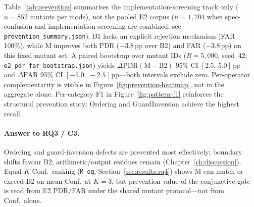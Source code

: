 \begin{table}[H]
  \caption{Implementation-screening prevention (E2 full evaluation,
    \texttt{prevention\_full\_v1}, $n{=}852$ mutant evaluations per mode).
    PDR = fraction of faulty mutants correctly rejected; FAR = fraction of
    faulty mutants incorrectly accepted (escape / false-accept rate;
    $\mathrm{PDR}+\mathrm{FAR}=1$ on this set).
    Spec-confusion breakdown appears in Figure~\ref{fig:prevention-heatmap}.}
  \label{tab:prevention}
  \centering
\end{table}

Table~\ref{tab:prevention} summarises the implementation-screening track only
($n{=}852$ mutants per mode), not the pooled E2 corpus ($n{=}1{,}704$ when
spec-confusion and implementation-screening are combined; see
\texttt{prevention\_summary.json}).
B1 lacks an explicit rejection mechanism (FAR 100\%), while M improves both
PDR (+3.8\,pp over B2) and FAR ($-$3.8\,pp) on this fixed mutant set.
A paired bootstrap over mutant IDs ($B{=}5{,}000$, seed~42;
\texttt{e2\_pdr\_far\_bootstrap.json}) yields
$\Delta\mathrm{PDR}(\mathrm{M}{-}\mathrm{B2})$ 95\% CI
$[2.5,\,5.0]$\,pp and $\Delta\mathrm{FAR}$ 95\% CI
$[-5.0,\,{-}2.5]$\,pp---both intervals exclude zero.
Per-operator complementarity is visible in
Figure~\ref{fig:prevention-heatmap}, not in the aggregate alone.
Per-category F1 in Figure~\ref{fig:pattern-f1} reinforces the structural
prevention story: Ordering and GuardInversion achieve the highest recall.

\paragraph{Answer to RQ3 / C3.}
Ordering and guard-inversion defects are prevented most effectively;
boundary shifts favour B2; arithmetic/output residues remain
(Chapter~\ref{ch:discussion}).
Equal-$K$ Conf.\ ranking (\texttt{M\_eq}, Section~\ref{sec:results:rq4})
shows M can match or exceed B2 on mean Conf.\ at $K{=}3$, but prevention
value of the conjunctive gate is read from E2 PDR/FAR under the shared mutant
protocol---not from Conf.\ alone.

